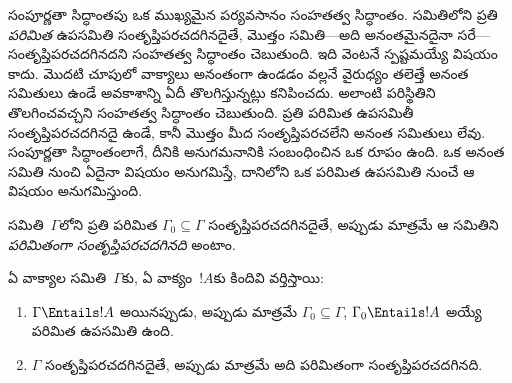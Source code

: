 \documentclass[../../../include/open-logic-section]{subfiles}
\begin{document}
      {}
      {}


సంపూర్ణతా సిద్ధాంతపు ఒక ముఖ్యమైన పర్యవసానం సంహతత్వ సిద్ధాంతం.
 సమితిలోని ప్రతి
\emph{పరిమిత} ఉపసమితి సంతృప్తిపరచదగినదైతే, మొత్తం సమితి---అది
అనంతమైనదైనా సరే---సంతృప్తిపరచదగినదని సంహతత్వ సిద్ధాంతం చెబుతుంది.
ఇది వెంటనే స్పష్టమయ్యే విషయం కాదు. మొదటి చూపులో వాక్యాలు అనంతంగా
ఉండడం వల్లనే వైరుధ్యం తలెత్తే అనంత  సమితులు
ఉండే అవకాశాన్ని ఏదీ తొలగిస్తున్నట్లు కనిపించదు. అలాంటి పరిస్థితిని
తొలగించవచ్చని సంహతత్వ సిద్ధాంతం చెబుతుంది. ప్రతి పరిమిత ఉపసమితీ
సంతృప్తిపరచదగినదై ఉండే, కానీ మొత్తం మీద సంతృప్తిపరచలేని అనంత
 సమితులు లేవు. సంపూర్ణతా సిద్ధాంతంలాగే, దీనికి అనుగమనానికి
సంబంధించిన ఒక రూపం ఉంది. ఒక అనంత  సమితి నుంచి ఏదైనా విషయం
అనుగమిస్తే, దానిలోని ఒక పరిమిత ఉపసమితి నుంచే ఆ విషయం అనుగమిస్తుంది.

\begin{defn}
   సమితి~$\Gamma$లోని ప్రతి పరిమిత $\Gamma_0 \subseteq
  \Gamma$ సంతృప్తిపరచదగినదైతే, అప్పుడు మాత్రమే ఆ సమితిని
  \emph{పరిమితంగా సంతృప్తిపరచదగినది} అంటాం.
\end{defn}

\begin{thm}[సంహతత్వ సిద్ధాంతం]
ఏ వాక్యాల సమితి~$\Gamma$కు, ఏ వాక్యం~$!A$కు కిందివి
వర్తిస్తాయి:
\begin{enumerate}
  \item $\Gamma \Entails !A$ అయినప్పుడు, అప్పుడు మాత్రమే $\Gamma_0
    \subseteq \Gamma$, $\Gamma_0 \Entails !A$ అయ్యే పరిమిత ఉపసమితి
    ఉంది.
  \item $\Gamma$ సంతృప్తిపరచదగినదైతే, అప్పుడు మాత్రమే అది పరిమితంగా
    సంతృప్తిపరచదగినది.
\end{enumerate}
\end{thm}
\end{document}
